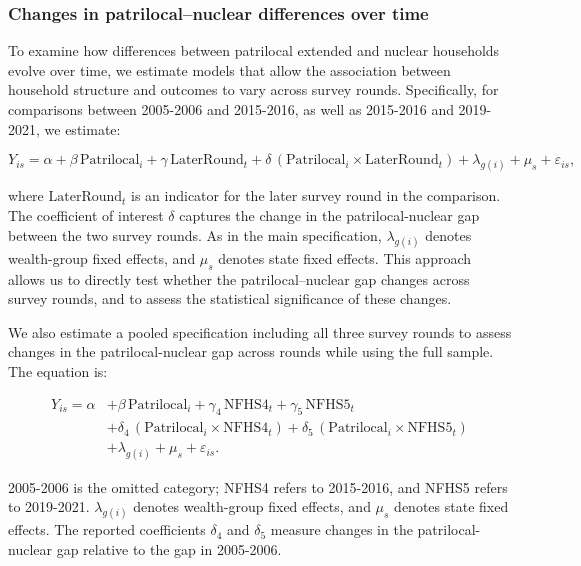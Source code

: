\documentclass[12pt]{article}
\begin{document}
\subsubsection{Changes in patrilocal–nuclear differences over time}

To examine how differences between patrilocal extended and nuclear households evolve over time, we estimate models that allow the association between household structure and outcomes to vary across survey rounds. Specifically, for comparisons between 2005-2006 and 2015-2016, as well as 2015-2016 and 2019-2021, we estimate:

\begin{equation} \label{eq:tworounds}
Y_{is} = \alpha + \beta \,\text{Patrilocal}_i + \gamma \,\text{LaterRound}_t
+ \delta \,(\text{Patrilocal}_i \times \text{LaterRound}_t)
+ \lambda_{g(i)} + \mu_s + \varepsilon_{is},
\end{equation}


where $\text{LaterRound}_t$ is an indicator for the later survey round in the comparison. The coefficient of interest $\delta$ captures the change in the patrilocal-nuclear gap between the two survey rounds. As in the main specification, $\lambda_{g(i)}$ denotes wealth-group fixed effects, and $\mu_s$ denotes state fixed effects. This approach allows us to directly test whether the patrilocal–nuclear gap changes across survey rounds, and to assess the statistical significance of these changes.

We also estimate a pooled specification including all three survey rounds to assess changes in the patrilocal-nuclear gap across rounds while using the full sample. The equation is:

\begin{equation} \label{eq:stacked}
\begin{aligned}
Y_{is} = \alpha 
&+ \beta \,\text{Patrilocal}_i
+ \gamma_4 \,\text{NFHS4}_t
+ \gamma_5 \,\text{NFHS5}_t \\
&+ \delta_4 \,(\text{Patrilocal}_i \times \text{NFHS4}_t)
+ \delta_5 \,(\text{Patrilocal}_i \times \text{NFHS5}_t) \\
&+ \lambda_{g(i)} + \mu_s + \varepsilon_{is}.
\end{aligned}
\end{equation}

2005-2006 is the omitted category; NFHS4 refers to 2015-2016, and NFHS5 refers to 2019-2021. $\lambda_{g(i)}$ denotes wealth-group fixed effects, and $\mu_s$ denotes state fixed effects. The reported coefficients $\delta_4$ and $\delta_5$ measure changes in the patrilocal-nuclear gap relative to the gap in 2005-2006.
\end{document}
